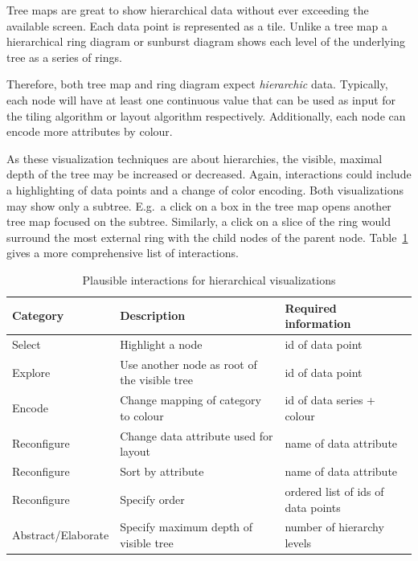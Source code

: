 Tree maps are great to show hierarchical data without ever exceeding the available screen.
Each data point is represented as a tile.
Unlike a tree map a hierarchical ring diagram or sunburst diagram shows each level of the underlying tree as a series of rings.

Therefore, both tree map and ring diagram expect \emph{hierarchic} data.
Typically, each node will have at least one continuous value that can be used as input for the tiling algorithm or layout algorithm respectively.
Additionally, each node can encode more attributes by colour.

As these visualization techniques are about hierarchies, the visible, maximal depth of the tree may be increased or decreased.
Again, interactions could include a highlighting of data points and a change of color encoding.
Both visualizations may show only a subtree.
E.g.\ a click on a box in the tree map opens another tree map focused on the subtree.
Similarly, a click on a slice of the ring would surround the most external ring with the child nodes of the parent node.
Table~\ref{tab:analysis:hierarchies:interactions} gives a more comprehensive list of interactions.


\begin{table}[H]
  \caption{Plausible interactions for hierarchical visualizations}%
  \label{tab:analysis:hierarchies:interactions}
  \begin{tabular*}{\textwidth}{lll}
    \bf Category & \bf Description & \bf Required information \\
    \hline
    Select & Highlight a node & id of data point \\
    Explore & Use another node as root of the visible tree & id of data point \\
    Encode & Change mapping of category to colour & id of data series + colour \\
    Reconfigure & Change data attribute used for layout & name of data attribute \\
    Reconfigure & Sort by attribute & name of data attribute \\
    Reconfigure & Specify order & ordered list of ids of data points \\
    Abstract/Elaborate & Specify maximum depth of visible tree & number of hierarchy levels \\
  \end{tabular*}
\end{table}


